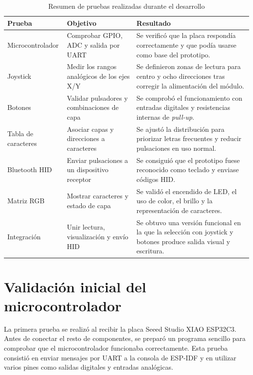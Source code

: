 \begin{table}[H]
    \centering
    \caption{Resumen de pruebas realizadas durante el desarrollo}
    \label{tab:pruebas-realizadas}
    \begin{tabularx}{\textwidth}{@{}p{}p{}X@{}}
        \toprule
        \textbf{Prueba} & \textbf{Objetivo} & \textbf{Resultado} \\
        \midrule
        Microcontrolador & Comprobar GPIO, ADC y salida por UART & Se verificó que la placa respondía correctamente y que podía usarse como base del prototipo. \\
        Joystick & Medir los rangos analógicos de los ejes X/Y & Se definieron zonas de lectura para centro y ocho direcciones tras corregir la alimentación del módulo. \\
        Botones & Validar pulsadores y combinaciones de capa & Se comprobó el funcionamiento con entradas digitales y resistencias internas de \textit{pull-up}. \\
        Tabla de caracteres & Asociar capas y direcciones a caracteres & Se ajustó la distribución para priorizar letras frecuentes y reducir pulsaciones en uso normal. \\
        Bluetooth HID & Enviar pulsaciones a un dispositivo receptor & Se consiguió que el prototipo fuese reconocido como teclado y enviase códigos HID. \\
        Matriz RGB & Mostrar caracteres y estado de capa & Se validó el encendido de LED, el uso de color, el brillo y la representación de caracteres. \\
        Integración & Unir lectura, visualización y envío HID & Se obtuvo una versión funcional en la que la selección con joystick y botones produce salida visual y escritura. \\
        \bottomrule
    \end{tabularx}
\end{table}

\section{Validación inicial del microcontrolador}
\label{sec:validacion-microcontrolador}

La primera prueba se realizó al recibir la placa Seeed Studio XIAO ESP32C3. Antes de conectar el resto de componentes, se preparó un programa sencillo para comprobar que el microcontrolador funcionaba correctamente. Esta prueba consistió en enviar mensajes por UART a la consola de ESP-IDF y en utilizar varios pines como salidas digitales y entradas analógicas.

